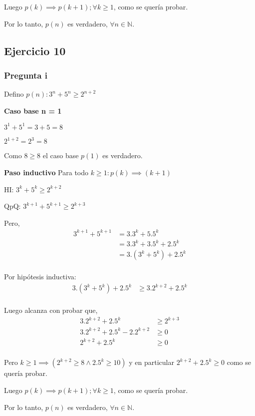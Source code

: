 Luego $p(k) \implies p(k+1); \forall k \geq 1$, como se quería probar.

Por lo tanto, $p(n)$ es verdadero, $\forall n \in \mathbb{N}$.

\subsection{Ejercicio 10}

\subsubsection{Pregunta i}

Defino $ p(n): 3^n + 5^n \geq 2^{n+2}$

\textbf{Caso base n = 1}

$3^1 + 5^1 = 3 + 5 = 8$

$2^{1+2} = 2^3 = 8$

Como $ 8 \geq 8 $ el caso base $p(1)$ es verdadero.

\textbf{Paso inductivo}
Para todo $k \geq 1: p(k) \implies (k+1)$

HI: $ 3^k + 5^k \geq 2^{k+2}$

QpQ: $ 3^{k+1} + 5^{k+1} \geq 2^{k+3}$

Pero,
\begin{align*}
    3^{k+1} + 5^{k+1} &= 3.3^k + 5.5^k \\ 
    &= 3.3^k + 3.5^k + 2.5^k \\
    &= 3.(3^k + 5^k) + 2.5^k \\
\end{align*}

Por hipótesis inductiva:
\begin{align*}
    3.(3^k + 5^k) + 2.5^k &\geq 3.2^{k+2} + 2.5^k \\
\end{align*}

Luego alcanza con probar que,
\begin{align*}
    3.2^{k+2} + 2.5^k &\geq 2^{k+3} \\
    3.2^{k+2} + 2.5^k - 2.2^{k+2} &\geq 0 \\
    2^{k+2} + 2.5^k &\geq 0 \\
\end{align*}

Pero $k \geq 1 \implies (2^{k+2} \geq 8 \wedge 2.5^k \geq 10)$ y en particular $2^{k+2} + 2.5^k \geq 0 $ como se quería probar.

Luego $p(k) \implies p(k+1); \forall k \geq 1$, como se quería probar.

Por lo tanto, $p(n)$ es verdadero, $\forall n \in \mathbb{N}$.



